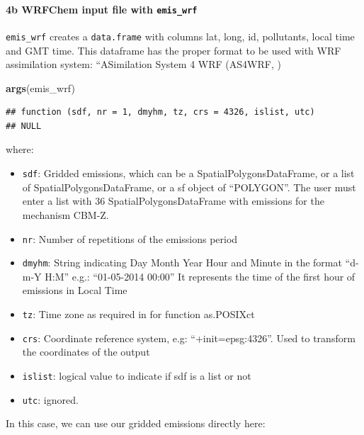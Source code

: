 \documentclass[12pt,graybox,envcountchap,sectrefs]{krantz}
\makeatletter
\newenvironment{Shaded}{\begin{snugshade}}{\end{snugshade}}
\newcommand{\KeywordTok}[1]{\textcolor[rgb]{0.13,0.29,0.53}{\textbf{#1}}}
\newcommand{\DataTypeTok}[1]{\textcolor[rgb]{0.13,0.29,0.53}{#1}}
\newcommand{\StringTok}[1]{\textcolor[rgb]{0.31,0.60,0.02}{#1}}
\newcommand{\OtherTok}[1]{\textcolor[rgb]{0.56,0.35,0.01}{#1}}
\newcommand{\OperatorTok}[1]{\textcolor[rgb]{0.81,0.36,0.00}{\textbf{#1}}}
\newcommand{\NormalTok}[1]{#1}
\providecommand{\tightlist}{%
  \setlength{\itemsep}{0pt}\setlength{\parskip}{0pt}}
\let\oldparagraph\paragraph
\renewcommand{\paragraph}[1]{\oldparagraph{#1}\mbox{}}
\newenvironment{kframe}{%
\medskip{}
\setlength{\fboxsep}{.8em}
 \def\at@end@of@kframe{}%
 \ifinner\ifhmode%
  \def\at@end@of@kframe{\end{minipage}}%
  \begin{minipage}{\columnwidth}%
 \fi\fi%
 \def\FrameCommand##1{\hskip\@totalleftmargin \hskip-\fboxsep
 \colorbox{shadecolor}{##1}\hskip-\fboxsep
     \hskip-\linewidth \hskip-\@totalleftmargin \hskip\columnwidth}%
 \MakeFramed {\advance\hsize-\width
   \@totalleftmargin\z@ \linewidth\hsize
   \@setminipage}}%
 {\par\unskip\endMakeFramed%
 \at@end@of@kframe}
\renewenvironment{Shaded}{\begin{kframe}}{\end{kframe}}
\theoremstyle{definition}
\theoremstyle{definition}
\theoremstyle{definition}
\theoremstyle{remark}
\makeatother
\begin{document}
\paragraph{\texorpdfstring{4b WRFChem input file with
\texttt{emis\_wrf}}{4b WRFChem input file with emis\_wrf}}\label{b-wrfchem-input-file-with-emis_wrf}

\texttt{emis\_wrf} creates a \texttt{data.frame} with columns lat, long,
id, pollutants, local time and GMT time. This dataframe has the proper
format to be used with WRF assimilation system: ``ASimilation System 4
WRF (AS4WRF, \citet{angel})

\begin{Shaded}
\begin{Highlighting}[]
\KeywordTok{args}\NormalTok{(emis_wrf)}
\end{Highlighting}
\end{Shaded}

\begin{verbatim}
## function (sdf, nr = 1, dmyhm, tz, crs = 4326, islist, utc) 
## NULL
\end{verbatim}

where:

\begin{itemize}
\tightlist
\item
  \texttt{sdf}: Gridded emissions, which can be a
  SpatialPolygonsDataFrame, or a list of SpatialPolygonsDataFrame, or a
  sf object of ``POLYGON''. The user must enter a list with 36
  SpatialPolygonsDataFrame with emissions for the mechanism CBM-Z.
\item
  \texttt{nr}: Number of repetitions of the emissions period
\item
  \texttt{dmyhm}: String indicating Day Month Year Hour and Minute in
  the format ``d-m-Y H:M'' e.g.: ``01-05-2014 00:00'' It represents the
  time of the first hour of emissions in Local Time
\item
  \texttt{tz}: Time zone as required in for function as.POSIXct
\item
  \texttt{crs}: Coordinate reference system, e.g: ``+init=epsg:4326''.
  Used to transform the coordinates of the output
\item
  \texttt{islist}: logical value to indicate if sdf is a list or not
\item
  \texttt{utc}: ignored.
\end{itemize}

In this case, we can use our gridded emissions directly here:

\begin{Shaded}
\end{Shaded}
\end{document}
